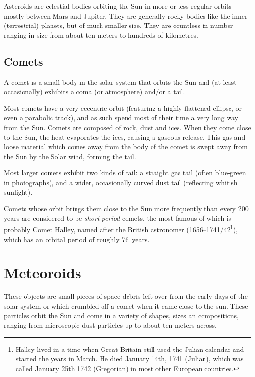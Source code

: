 Asteroids are celestial bodies orbiting the Sun in more or less regular
orbits mostly between Mars and Jupiter. They are generally rocky bodies
like the inner (terrestrial) planets, but of much smaller size. They
are countless in number ranging in size from about ten meters to
hundreds of kilometres.

\subsection{Comets}
\label{sec:Phenomena:Comets}

A comet is a small body in the solar system that orbits the Sun and (at
least occasionally) exhibits a coma (or atmosphere) and/or a tail.

Most comets have a very eccentric orbit (featuring a highly flattened
ellipse, or even a parabolic track), and as such spend most of their
time a very long way from the Sun. Comets are composed of rock, dust
and ices. When they come close to the Sun, the heat evaporates the
ices, causing a gaseous release. This gas and loose material which
comes away from the body of the comet is swept away from the Sun by
the Solar wind, forming the tail.

Most larger comets exhibit two kinds of tail: a straight gas tail
(often blue-green in photographs), and a wider, occasionally curved
dust tail (reflecting whitish sunlight).

Comets whose orbit brings them close to the Sun more frequently than
every 200 years are considered to be \emph{short period} comets, the
most famous of which is probably Comet Halley, named after the British
astronomer  (1656--1741/42\footnote{Halley lived 
in a time when Great Britain still used the Julian calendar and started 
the years in March. He died January 14th, 1741 (Julian), 
which was called January 25th 1742 (Gregorian) in most other European countries.}), 
which has an orbital period of roughly 76~years.


\section{Meteoroids}
\label{sec:Phenomena:Meteoroids}

These objects are small pieces of space debris left over from the early
days of the solar system or which crumbled off a comet when it came close to the sun. 
These particles orbit the Sun and come in a variety of shapes, 
sizes an compositions, ranging from microscopic dust particles
up to about ten meters across.

